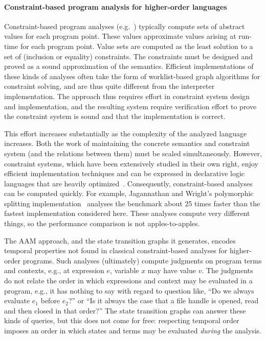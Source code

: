 \documentclass[preprint,onecolumn,9pt]{sigplanconf} %
\begin{document}
\paragraph{Constraint-based program analysis for higher-order languages}

Constraint-based program analyses
(e.g.~\cite{dvanhorn:nielson-nielson-popl97,dvanhorn:wright-jagannathan-toplas98,dvanhorn:Meunier2006Modular,dvanhorn:steckler-wand-toplas97})
typically compute sets of abstract values for each program point.
These values approximate values arising at run-time for each
program point.  Value sets are computed as the least solution to a set
of (inclusion or equality) constraints.  The
constraints must be designed and proved as a sound approximation of
the semantics.  Efficient implementations of these kinds of analyses
often take the form of worklist-based graph algorithms for constraint
solving, and are thus quite different from the interpreter
implementation.  The approach thus requires effort in constraint
system design and implementation, and the resulting system require
verification effort to prove the constraint system is sound and that
the implementation is correct.

This effort increases substantially as the complexity of the analyzed
language increases.  Both the work of maintaining the concrete
semantics and constraint system (and the relations between them) must
be scaled simultaneously.  However, constraint systems, which have
been extensively studied in their own right, enjoy efficient
implementation techniques and can be expressed in declarative logic
languages that are heavily
optimized~\cite{dvanhorn:bravenboer-smaragdakis-oopsla09}.
Consequently, constraint-based analyses can be computed quickly.  For
example, Jagannathan and Wright's polymorphic splitting
implementation~\cite{dvanhorn:wright-jagannathan-toplas98} analyses
the \Church{} benchmark about 25 times faster than the fastest
implementation considered here.  These analyses compute very different
things, so the performance comparison is not apples-to-apples.

The AAM approach, and the state transition graphs it generates, encodes
temporal properties not found in classical constraint-based analyses
for higher-order programs.
%
Such analyses (ultimately) compute judgments on program terms and
contexts, e.g., at expression $e$, variable $x$ may have value $v$.
%
The judgments do not relate the order in which expressions and context
may be evaluated in a program, e.g., it has nothing
to say with regard to question like, ``Do we always evaluate $e_1$
before $e_2$?'' or ``Is it always the case that a file handle is
opened, read and then closed in that order?''
%
The state transition graphs can answer these kinds of queries, but
this does not come for free: respecting temporal order imposes an
order in which states and terms may be evaluated \emph{during} the
analysis.
\end{document}
